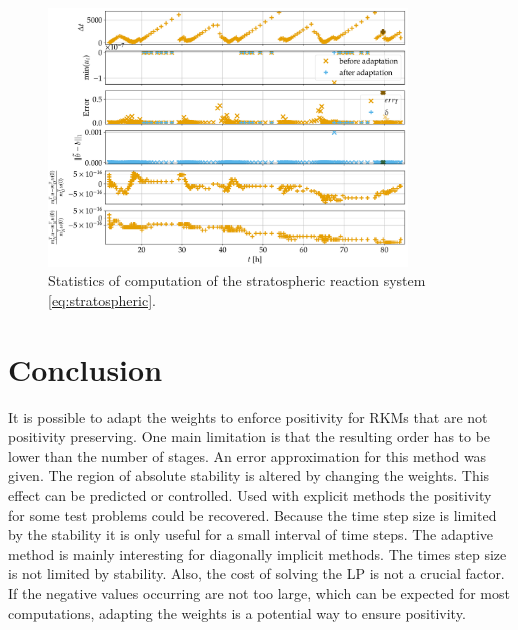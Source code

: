 \documentclass[a4paper]{article}
\numberwithin{equation}{section}
\theoremstyle{plain}
\theoremstyle{definition}
\numberwithin{theorem}{section}
\newcommand{\1}{\mathbbm{1}}
\begin{document}
\begin{figure}
\centering
\includegraphics[width=0.85\textwidth]{plots/Stratospheric_stepsize_b.pdf}
\caption{Statistics of computation of the stratospheric reaction system
         \eqref{eq:stratospheric}.}
\label{fig:Stats_Strat}
\end{figure}


\section{Conclusion} \label{sec:conclusion}

It is possible to adapt the weights to enforce positivity for RKMs that are not positivity preserving.
One main limitation is that the resulting order has to be lower than the number of stages.
An error approximation for this method was given.
The region of absolute stability is altered by changing the weights. This effect can be predicted or controlled.
Used with explicit methods the positivity for some test problems could be recovered.
Because the time step size is limited by the stability it is only useful for a small interval of time steps.
The adaptive method is mainly interesting for diagonally implicit methods.
The times step size is not limited by stability.
Also, the cost of solving the LP is not a crucial factor.
If the negative values occurring are not too large, which can be expected for most computations, adapting the weights is a potential way to ensure positivity.



\printbibliography
\end{document}
